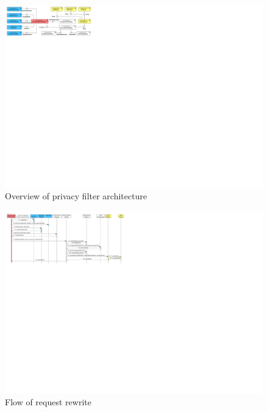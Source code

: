 \begin{figure}
    \centering
    \includegraphics[width=1.0\textwidth]{images/architecture/PePSA-System-Overview.pdf}
    \caption{Overview of \middleware{} privacy filter architecture}
    \label{fig:arch-overview}
\end{figure}



\begin{figure}
    \centering
    \includegraphics[width=1.0\textwidth]{images/architecture/InteractionDiagram-Rewrite-Flow-PePSA.pdf}
    \caption{Flow of \middleware{} request rewrite}
    \label{fig:pepsa-sequence}
\end{figure}